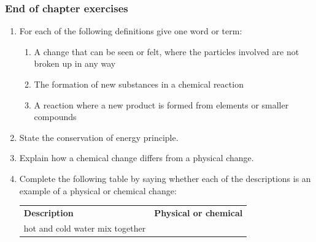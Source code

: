             \subsubsection{ End of chapter exercises}
            \nopagebreak
      \label{m38711*id65631}\begin{enumerate}[noitemsep, label=\textbf{\arabic*}. ] 
            \label{m38711*uid6234}\item For each of the following definitions give one word or term:
\label{m38711*id632243}\begin{enumerate}[noitemsep, label=\textbf{\alph*}. ] 
            \item A change that can be seen or felt, where the particles involved are not broken up in any way\item The formation of new substances in a chemical reaction\item A reaction where a new product is formed from elements or smaller compounds\end{enumerate}
\label{m38711*id63272}\item State the conservation of energy principle.\newline
\label{m38711*id6244}\item Explain how a chemical change differs from a physical change.\newline
\label{m38711*uid52}\item Complete the following table by saying whether each of the descriptions is an example of a physical or chemical change:
          \begin{table}[H]
        \begin{center}
      \label{m38711*id65648}
    \noindent
      \tablelasttail{}
      \begin{xtabular}[t]{|l|l|}\hline
        \textbf{Description} &
        \textbf{Physical or chemical}%
     \tabularnewline{}
        hot and cold water mix together &
     \tabularnewline{}

\end{xtabular}
\end{center}
\end{table}
\end{enumerate}
